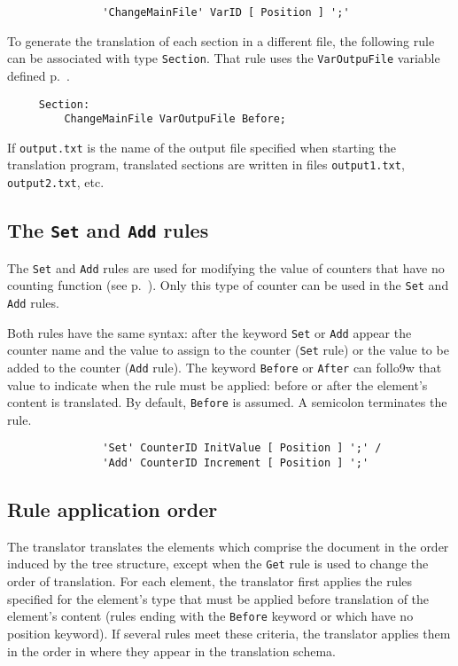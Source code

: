 \begin{verbatim}
               'ChangeMainFile' VarID [ Position ] ';'
\end{verbatim}

\begin{example}
To generate the translation of each section in a different file,
the following rule can be associated with type {\tt Section}.
That rule uses the {\tt VarOutpuFile} variable defined
p.~\pageref{varoutputfile}.
\begin{verbatim}
     Section:
         ChangeMainFile VarOutpuFile Before;
\end{verbatim}
If {\tt output.txt} is the name of the output file specified when
starting the translation program, translated sections are written
in files {\tt output1.txt}, {\tt output2.txt}, etc.
\end{example}

\subsection{The {\tt Set} and {\tt Add} rules}
\label{setandadd}

The {\tt Set} and {\tt Add} rules are used for modifying the value
of counters that have no counting function (see p.~\pageref{counters}).
Only this type of counter can be used in the {\tt Set} and {\tt Add}
rules.

Both rules have the same syntax: after the keyword {\tt Set} or {\tt Add}
appear the counter name and the value to assign to the counter
({\tt Set} rule) or the value to be added to the counter
({\tt Add} rule). The keyword {\tt Before} or {\tt After} can follo9w
that value to indicate when the rule must be applied: before or after
the element's content is translated. By default, {\tt Before} is assumed.
A semicolon terminates the rule.

\begin{verbatim}
               'Set' CounterID InitValue [ Position ] ';' /
               'Add' CounterID Increment [ Position ] ';'
\end{verbatim}

\subsection{Rule application order}
\label{order}

The translator translates the elements which comprise the document in
the order induced by the tree structure, except when the {\tt Get}
rule is used to change the order of translation.  For each element,
the translator first applies the rules specified for the element's
type that must be applied before translation of the element's content
(rules ending with the {\tt Before} keyword or which have no position
keyword).  If several rules meet these criteria, the translator
applies them in the order in where they appear in the translation
schema.

